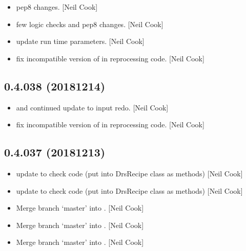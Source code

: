 \documentclass[a4paper,10pt,english]{report}
\begin{document}
\begin{itemize}
\item {} 
 \sphinxhyphen{} pep8 changes. {[}Neil Cook{]}

\item {} 
 \sphinxhyphen{} few logic checks and pep8 changes. {[}Neil
Cook{]}

\item {} 
 \sphinxhyphen{} update run time parameters. {[}Neil Cook{]}

\item {} 
 \sphinxhyphen{} fix incompatible version of  in
reprocessing code. {[}Neil Cook{]}

\end{itemize}


\subsection{0.4.038 (2018\sphinxhyphen{}12\sphinxhyphen{}14)}
\label{\detokenize{misc/changelog:id253}}\begin{itemize}
\item {} 
 and  \sphinxhyphen{} continued update to input
redo. {[}Neil Cook{]}

\item {} 
 \sphinxhyphen{} fix incompatible version of  in
reprocessing code. {[}Neil Cook{]}

\end{itemize}


\subsection{0.4.037 (2018\sphinxhyphen{}12\sphinxhyphen{}13)}
\label{\detokenize{misc/changelog:id254}}\begin{itemize}
\item {} 
 \sphinxhyphen{} update to check code (put into DrsRecipe class as
methods) {[}Neil Cook{]}

\item {} 
 \sphinxhyphen{} update to check code (put into DrsRecipe class as
methods) {[}Neil Cook{]}

\item {} 
Merge branch ‘master’ into . {[}Neil Cook{]}

\item {} 
Merge branch ‘master’ into . {[}Neil Cook{]}

\item {} 
Merge branch ‘master’ into . {[}Neil Cook{]}

\end{itemize}
\end{document}
